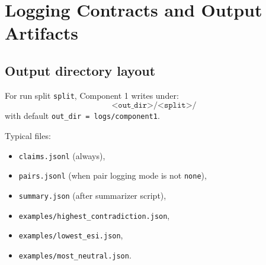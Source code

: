 \section{Logging Contracts and Output Artifacts}
\label{sec:c1_outputs}

\subsection{Output directory layout}
For run split \texttt{split}, Component 1 writes under:
\begin{equation}
\texttt{<out\_dir>/<split>/}
\end{equation}
with default \texttt{out\_dir = logs/component1}.

Typical files:
\begin{itemize}
\item \texttt{claims.jsonl} (always),
\item \texttt{pairs.jsonl} (when pair logging mode is not \texttt{none}),
\item \texttt{summary.json} (after summarizer script),
\item \texttt{examples/highest\_contradiction.json},
\item \texttt{examples/lowest\_esi.json},
\item \texttt{examples/most\_neutral.json}.
\end{itemize}

